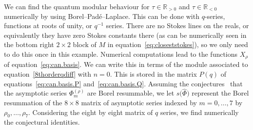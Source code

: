 \documentclass[pdftex]{sigma}
\numberwithin{equation}{section}
\def\BR{\mathbb{R}}
\def\BR{\mathbb R}
\begin{document}
We can find the quantum modular behaviour for $\tau\in\BR_{>0}$ and $\tau\in\BR_{<0}$ numerically by using Borel--Pad\'e--Laplace. This can be done with $q$-series, functions at roots of unity, or $q^{-1}$ series. There are no Stokes lines on the reals, or equivalently they have zero Stokes constants there (as can be numerically seen in the bottom right $2\times2$ block of $M$ in equation~\eqref{eq:closeststokes}), so we only need to do this once in this example. Numerical computations lead to the functions $X_{\rho}$ of equation~\eqref{eq:can.basis}. We can write this in terms of the module associated to equation~\eqref{8thorderqdiff} with $n=0$. This is stored in the matrix $P(q)$ of equations~\eqref{eq:can.basis.P} and~\eqref{eq:can.basis.Q}. Assuming the conjectures~\cite{Gar:resCS} that the asymptotic series $\Phi^{(\rho)}_{m}$ are Borel resummable, we let $s\bigl(\widehat{\Phi}\bigr)$ represent the Borel resummation of the $8\times 8$ matrix of asymptotic series indexed by $m=0,\dots,7$ by $\rho_0,\dots,\rho_7$. Considering the eight by eight matrix of $q$ series, we find numerically the conjectural identities.
\end{document}

